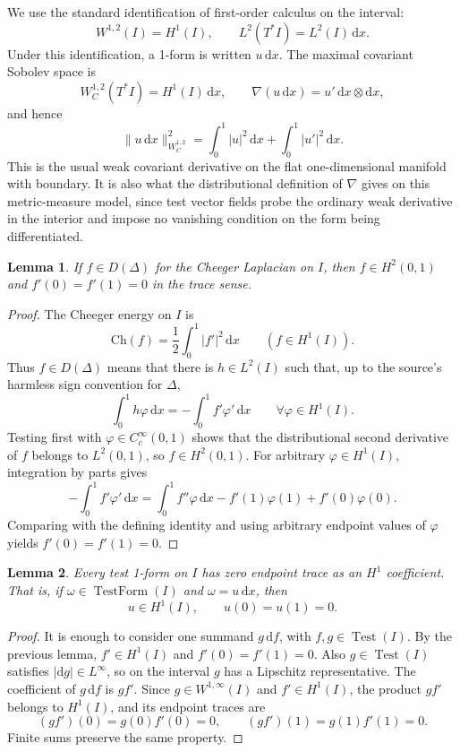 \documentclass[11pt]{article}
\newtheorem{lemma}{Lemma}
\newcommand{\dd}{\mathrm d}
\newcommand{\dx}{\mathrm dx}
\newcommand{\Test}{\operatorname{Test}}
\newcommand{\TestForm}{\operatorname{TestForm}}
\begin{document}
We use the standard identification of first-order calculus on the interval:
\[
  W^{1,2}(I)=H^1(I), \qquad
  L^2(T^*I)=L^2(I)\,\dx.
\]
Under this identification, a 1-form is written \(u\,\dx\). The maximal
covariant Sobolev space is
\[
  W_C^{1,2}(T^*I)=H^1(I)\,\dx,
  \qquad
  \nabla(u\,\dx)=u'\,\dx\otimes\dx,
\]
and hence
\[
  \|u\,\dx\|_{W_C^{1,2}}^2
  =
  \int_0^1 |u|^2\,\dx+\int_0^1 |u'|^2\,\dx.
\]
This is the usual weak covariant derivative on the flat one-dimensional
manifold with boundary. It is also what the distributional definition of
\(\nabla\) gives on this metric-measure model, since test vector fields probe
the ordinary weak derivative in the interior and impose no vanishing condition
on the form being differentiated.

\begin{lemma}
If \(f\in D(\Delta)\) for the Cheeger Laplacian on \(I\), then
\(f\in H^2(0,1)\) and \(f'(0)=f'(1)=0\) in the trace sense.
\end{lemma}

\begin{proof}
The Cheeger energy on \(I\) is
\[
  \mathrm{Ch}(f)=\frac12\int_0^1 |f'|^2\,\dx
  \qquad (f\in H^1(I)).
\]
Thus \(f\in D(\Delta)\) means that there is \(h\in L^2(I)\) such that, up to
the source's harmless sign convention for \(\Delta\),
\[
  \int_0^1 h\varphi\,\dx=-\int_0^1 f'\varphi'\,\dx
  \qquad\forall \varphi\in H^1(I).
\]
Testing first with \(\varphi\in C_c^\infty(0,1)\) shows that the distributional
second derivative of \(f\) belongs to \(L^2(0,1)\), so \(f\in H^2(0,1)\). For
arbitrary \(\varphi\in H^1(I)\), integration by parts gives
\[
  -\int_0^1 f'\varphi'\,\dx
  =
  \int_0^1 f''\varphi\,\dx
  - f'(1)\varphi(1)+f'(0)\varphi(0).
\]
Comparing with the defining identity and using arbitrary endpoint values of
\(\varphi\) yields \(f'(0)=f'(1)=0\).
\end{proof}

\begin{lemma}
Every test 1-form on \(I\) has zero endpoint trace as an \(H^1\) coefficient.
That is, if \(\omega\in\TestForm(I)\) and \(\omega=u\,\dx\), then
\[
  u\in H^1(I),
  \qquad
  u(0)=u(1)=0.
\]
\end{lemma}

\begin{proof}
It is enough to consider one summand \(g\,\dd f\), with
\(f,g\in\Test(I)\). By the previous lemma, \(f'\in H^1(I)\) and
\(f'(0)=f'(1)=0\). Also \(g\in\Test(I)\) satisfies \(|\dd g|\in L^\infty\),
so on the interval \(g\) has a Lipschitz representative. The coefficient of
\(g\,\dd f\) is \(g f'\). Since \(g\in W^{1,\infty}(I)\) and \(f'\in H^1(I)\),
the product \(g f'\) belongs to \(H^1(I)\), and its endpoint traces are
\[
  (g f')(0)=g(0)f'(0)=0,
  \qquad
  (g f')(1)=g(1)f'(1)=0.
\]
Finite sums preserve the same property.
\end{proof}
\end{document}
